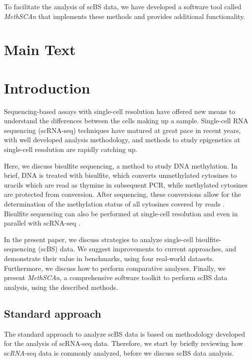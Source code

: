 \documentclass[10pt]{article}
\begin{document}
To facilitate the analysis of scBS data, we have developed a software tool called \textit{MethSCAn} that implements these methods and provides additional functionality.


\section*{Main Text}
\section*{Introduction}

Sequencing-based assays with single-cell resolution have offered new means to understand the differences between the cells making up a sample.
Single-cell RNA sequencing (scRNA-seq) techniques have matured at great pace in recent years, with well developed analysis methodology, and methods to study epigenetics at single-cell resolution are rapidly catching up.


Here, we discuss bisulfite sequencing, a method to study DNA methylation.
In brief, DNA is treated with bisulfite, which converts unmethylated cytosines to uracils which are read as thymine in subsequent PCR, while methylated cytosines are protected from conversion.
After sequencing, these conversions allow for the determination of the methylation status of all cytosines covered by reads \citep{Frommer_1992}.
Bisulfite sequencing can also be performed at single-cell resolution \citep{Smallwood_2014} and even in parallel with scRNA-seq \citep{scMTseq,Clark2018}.

In the present paper, we discuss strategies to analyze single-cell bisulfite-sequencing (scBS) data.
We suggest improvements to current approaches, and demonstrate their value in benchmarks, using four real-world datasets.
Furthermore, we discuss how to perform comparative analyses.
Finally, we present \textit{MethSCAn}, a comprehensive software toolkit to perform scBS data analysis, using the described methods.


\subsection*{Standard approach}

The standard approach to analyze scBS data is based on methodology developed for the analysis of scRNA-seq data.
Therefore, we start by briefly reviewing how sc\emph{RNA}-seq data is commonly analyzed, before we discuss scBS data analysis.
\end{document}
